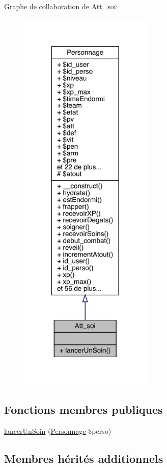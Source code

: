Graphe de collaboration de Att\+\_\+soi\+:\nopagebreak
\begin{figure}[H]
\begin{center}
\leavevmode
\includegraphics[width=179pt]{class_att__soi__coll__graph}
\end{center}
\end{figure}
\subsection*{Fonctions membres publiques}
\begin{DoxyCompactItemize}
\item 
\mbox{\hyperlink{class_att__soi_a7da2d15a0bedd2880e7491f72b430bf0}{lancer\+Un\+Soin}} (\mbox{\hyperlink{class_personnage}{Personnage}} \$perso)
\end{DoxyCompactItemize}
\subsection*{Membres hérités additionnels}



